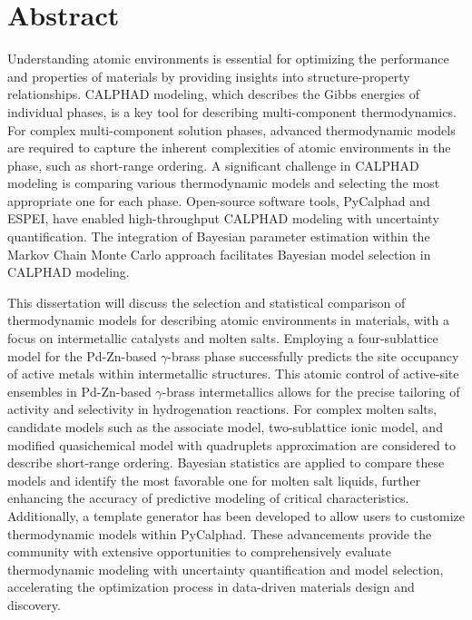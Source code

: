 \documentclass[letterpaper, 12pt]{report}
\begin{document}
\vfill

\newpage
\chapter*{Abstract}
Understanding atomic environments is essential for optimizing the performance and properties of materials by providing insights into structure-property relationships. CALPHAD modeling, which describes the Gibbs energies of individual phases, is a key tool for describing multi-component thermodynamics. For complex multi-component solution phases, advanced thermodynamic models are required to capture the inherent complexities of atomic environments in the phase, such as short-range ordering. A significant challenge in CALPHAD modeling is comparing various thermodynamic models and selecting the most appropriate one for each phase. Open-source software tools, PyCalphad and ESPEI, have enabled high-throughput CALPHAD modeling with uncertainty quantification. The integration of Bayesian parameter estimation within the Markov Chain Monte Carlo approach facilitates Bayesian model selection in CALPHAD modeling. 

This dissertation will discuss the selection and statistical comparison of thermodynamic models for describing atomic environments in materials, with a focus on intermetallic catalysts and molten salts. Employing a four-sublattice model for the Pd-Zn-based $\gamma$-brass phase successfully predicts the site occupancy of active metals within intermetallic structures. This atomic control of active-site ensembles in Pd-Zn-based $\gamma$-brass intermetallics allows for the precise tailoring of activity and selectivity in hydrogenation reactions. For complex molten salts, candidate models such as the associate model, two-sublattice ionic model, and modified quasichemical model with quadruplets approximation are considered to describe short-range ordering. Bayesian statistics are applied to compare these models and identify the most favorable one for molten salt liquids, further enhancing the accuracy of predictive modeling of critical characteristics. Additionally, a template generator has been developed to allow users to customize thermodynamic models within PyCalphad. These advancements provide the community with extensive opportunities to comprehensively evaluate thermodynamic modeling with uncertainty quantification and model selection, accelerating the optimization process in data-driven materials design and discovery.

\newpage
\setcounter{tocdepth}{3}
\tableofcontents
\end{document}
